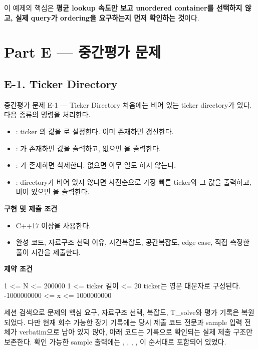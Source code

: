 이 예제의 핵심은 \textbf{평균 lookup 속도만 보고 unordered container를 선택하지 않고, 실제 query가 ordering을 요구하는지 먼저 확인하는 것}이다.

\section{Part E --- 중간평가 문제}

\subsection{E-1. Ticker Directory}
\begin{problembox}{중간평가 문제 E-1 --- Ticker Directory}
처음에는 비어 있는 ticker directory가 있다. 다음 종류의 명령을 처리한다.
\begin{itemize}
\item {}: ticker 의 값을 로 설정한다. 이미 존재하면 갱신한다.
\item {}: 가 존재하면 값을 출력하고, 없으면 을 출력한다.
\item {}: 가 존재하면 삭제한다. 없으면 아무 일도 하지 않는다.
\item {}: directory가 비어 있지 않다면 사전순으로 가장 빠른 ticker와 그 값을 출력하고, 비어 있으면 을 출력한다.
\end{itemize}

\textbf{구현 및 제출 조건}
\begin{itemize}
\item C++17 이상을 사용한다.
\item 완성 코드, 자료구조 선택 이유, 시간복잡도, 공간복잡도, edge case, 직접 측정한 풀이 시간을 제출한다.
\end{itemize}

\textbf{제약 조건}
\begin{TextBlock}
1 <= N <= 200000
1 <= ticker 길이 <= 20
ticker는 영문 대문자로 구성된다.
-1000000000 <= x <= 1000000000
\end{TextBlock}
\end{problembox}

\begin{notebox}[세션 복원 상태]
세션 검색으로 문제의 핵심 요구, 자료구조 선택, 복잡도, T\_solve와 평가 기록은 복원되었다. 다만 현재 회수 가능한 장기 기록에는 당시 제출 코드 전문과 sample 입력 전체가 verbatim으로 남아 있지 않아, 아래 코드는 기록으로 확인되는 실제 제출 구조만 보존한다. 확인 가능한 sample 출력에는 , , , , 이 순서대로 포함되어 있었다.
\end{notebox}

